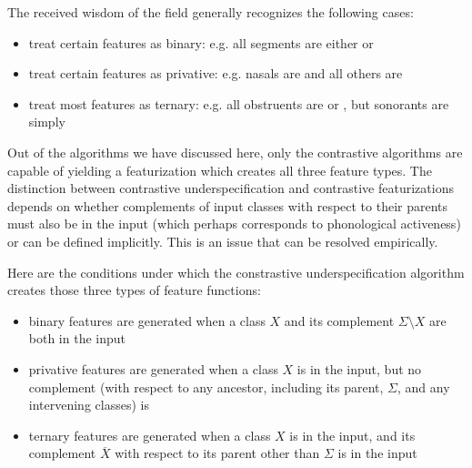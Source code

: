 \documentclass[11pt, oneside]{article}   	%
\begin{document}
The received wisdom of the field generally recognizes the following cases: \begin{itemize}
    \item treat certain features as binary: e.g. all segments are either  or 
    \item treat certain features as privative: e.g. nasals are  and all others are 
    \item treat most features as ternary: e.g. all obstruents are  or , but sonorants are simply 
    \end{itemize}
Out of the algorithms we have discussed here, only the contrastive algorithms are capable of yielding a featurization which creates all three feature types. The distinction between contrastive underspecification and contrastive featurizations depends on whether complements of input classes with respect to their parents must also be in the input (which perhaps corresponds to phonological activeness) or can be defined implicitly. This is an issue that can be resolved empirically.

Here are the conditions under which the constrastive underspecification algorithm creates those three types of feature functions:
\begin{itemize}
    \item binary features are generated when a class $X$ and its complement $\Sigma \setminus X$ are both in the input
    \item privative features are generated when a class $X$ is in the input, but no complement (with respect to any ancestor, including its parent, $\Sigma$, and any intervening classes) is
    \item ternary features are generated when a class $X$ is in the input, and its complement $\overline{X}$ with respect to its parent other than $\Sigma$ is in the input
    \end{itemize}
\end{document}
